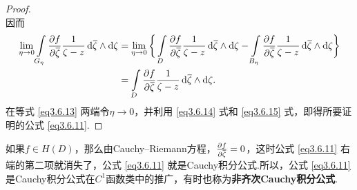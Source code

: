 \begin{proof}
\[  \]
  因而
  \begin{equation}\label{eq3.6.15}
    \begin{aligned}
      \lim_{\eta\to0}\int\limits_{G_\eta}\pp f{\bar\zeta}\frac1{\zeta-z}\dif \bar\zeta\wedge\dif \zeta & = \lim_{\eta\to0}\bigg\{
      \int\limits_{D}\pp f{\bar\zeta}\frac1{\zeta-z}\dif \bar\zeta\wedge\dif \zeta-\int\limits_{B_\eta}\pp f{\bar\zeta}\frac1{\zeta-z}\dif \bar\zeta\wedge\dif \zeta\bigg\}\\
      & = \int\limits_D\pp f{\bar\zeta}\frac1{\zeta-z}\dif \bar\zeta\wedge\dif \zeta.
    \end{aligned}
  \end{equation}
  在等式 \eqref{eq3.6.13} 两端令$\eta\to0$，并利用 \eqref{eq3.6.14} 式和 \eqref{eq3.6.15} 式，即得所要证明的公式 \eqref{eq3.6.11}.
\end{proof}

如果$f\in H(D)$，那么由Cauchy--Riemann方程，$\frac{\partial f}{\partial {}\mkern1mu\overline{\mkern-1mu\zeta}}=0$，这时公式 \eqref{eq3.6.11} 右端的第二项就消失了，公式 \eqref{eq3.6.11} 就是Cauchy积分公式.所以，公式 \eqref{eq3.6.11} 是Cauchy积分公式在$C^1$函数类中的推广，有时也称为\textbf{非齐次Cauchy积分公式}.


